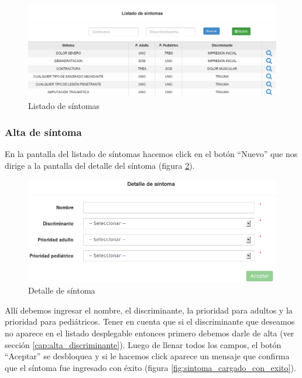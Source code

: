 \begin{figure}
\centerline{\includegraphics[width=1\textwidth]{listado_sintomas.png}}
\caption{Listado de síntomas}
\label{fig:listado_sintomas}
\end{figure}

\subsubsection{Alta de síntoma}\label{cap:alta_sintoma}
En la pantalla del listado de síntomas hacemos click en el botón ``Nuevo'' que nos dirige a la pantalla del detalle del síntoma (figura \ref{fig:detalle_sintoma}).
\begin{figure}
\centerline{\includegraphics[width=1\textwidth]{detalle_sintoma.png}}
\caption{Detalle de síntoma}
\label{fig:detalle_sintoma}
\end{figure}
Allí debemos ingresar el nombre, el discriminante, la prioridad para adultos y la prioridad para pediátricos. Tener en cuenta que si el discriminante que deseamos no aparece en el listado desplegable entonces primero debemos darle de alta (ver sección \ref{cap:alta_discriminante}). Luego de llenar todos los campos, el botón ``Aceptar'' se desbloquea y si le hacemos click aparece un mensaje que confirma que el síntoma fue ingresado con éxito (figura \ref{fig:sintoma_cargado_con_exito}).
